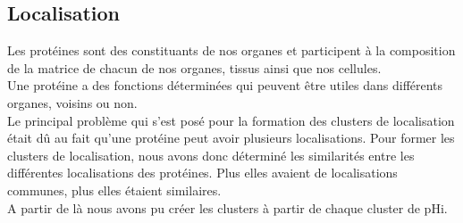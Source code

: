 \subsection*{Localisation}
Les protéines sont des constituants de nos organes et participent à la composition de la matrice de chacun de nos organes, tissus ainsi que nos cellules.\\%
Une protéine a des fonctions déterminées qui peuvent être utiles dans différents organes, voisins ou non. \\
Le principal problème qui s'est posé pour la formation des clusters de localisation était d\^u au fait qu'une protéine peut avoir plusieurs localisations.
Pour former les clusters de localisation, nous avons donc déterminé les similarités entre les différentes localisations des protéines. Plus elles avaient de localisations communes, plus elles étaient similaires.\\
A partir de là nous avons pu créer les clusters à partir de chaque cluster de pHi.











